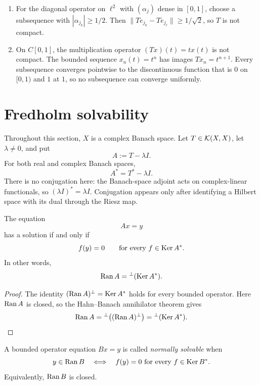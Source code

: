 \begin{noteexercise}
\begin{enumerate}
  \item For the diagonal operator on $\ell^2$ with $(\alpha_j)$ dense in
        $[0,1]$, choose a subsequence with $|\alpha_{j_k}|\ge1/2$.  Then
        $\|Te_{j_k}-Te_{j_\ell}\|\ge1/\sqrt2$, so $T$ is not compact.
  \item On $C[0,1]$, the multiplication operator $(Tx)(t)=tx(t)$ is not
        compact.  The bounded sequence $x_n(t)=t^n$ has images
        $Tx_n=t^{n+1}$.  Every subsequence converges pointwise to the
        discontinuous function that is $0$ on $[0,1)$ and $1$ at $1$, so no
        subsequence can converge uniformly.
\end{enumerate}
\end{noteexercise}

\section{Fredholm solvability}

Throughout this section, $X$ is a complex Banach space.  Let
$T\in\mathcal{K}(X,X)$, let $\lambda\ne0$, and put
\[
  A:=T-\lambda I.
\]
For both real and complex Banach spaces,
\[
  A^*=T^*-\lambda I.
\]
There is no conjugation here: the Banach-space adjoint acts on complex-linear
functionals, so $(\lambda I)^*=\lambda I$.  Conjugation appears only after
identifying a Hilbert space with its dual through the Riesz map.

\begin{notetheorem}[Solvability of $Ax=y$]
The equation
\[
  Ax=y
\]
has a solution if and only if
\[
  f(y)=0
  \qquad\text{for every }f\in\operatorname{Ker} A^*.
\]
In other words,
\[
  \operatorname{Ran} A={}^{\perp}(\operatorname{Ker} A^*).
\]
\end{notetheorem}

\begin{proof}
The identity $(\operatorname{Ran} A)^\perp=\operatorname{Ker} A^*$ holds for every bounded operator.  Here
$\operatorname{Ran} A$ is closed, so the Hahn--Banach annihilator theorem gives
\[
  \operatorname{Ran} A={}^{\perp}\bigl((\operatorname{Ran} A)^\perp\bigr)
        ={}^{\perp}(\operatorname{Ker} A^*).
\]
\end{proof}

\begin{notedefinition}
A bounded operator equation $Bx=y$ is called \emph{normally solvable} when
\[
  y\in\operatorname{Ran} B
  \quad\Longleftrightarrow\quad
  f(y)=0\text{ for every }f\in\operatorname{Ker} B^*.
\]
Equivalently, $\operatorname{Ran} B$ is closed.
\end{notedefinition}


